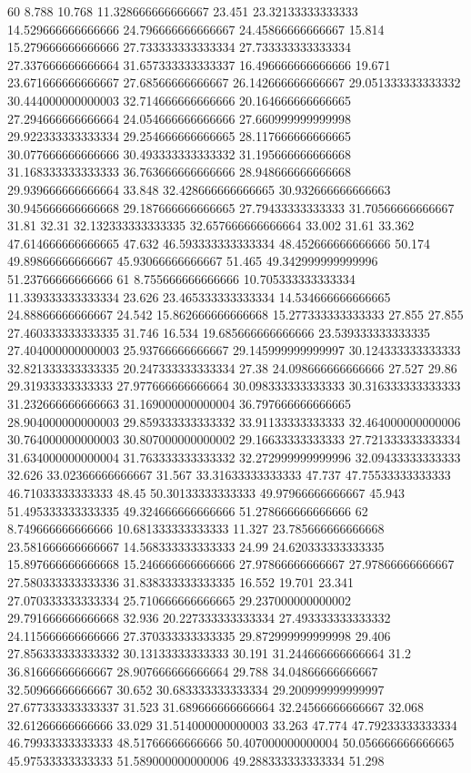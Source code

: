 60 8.788 10.768 11.328666666666667 23.451 23.32133333333333 14.529666666666666 24.796666666666667 24.45866666666667 15.814 15.279666666666666 27.733333333333334 27.733333333333334 27.337666666666664 31.657333333333337 16.496666666666666 19.671 23.671666666666667 27.68566666666667 26.142666666666667 29.051333333333332 30.444000000000003 32.714666666666666 20.164666666666665 27.294666666666664 24.054666666666666 27.660999999999998 29.922333333333334 29.254666666666665 28.117666666666665 30.077666666666666 30.493333333333332 31.195666666666668 31.168333333333333 36.763666666666666 28.948666666666668 29.939666666666664 33.848 32.428666666666665 30.932666666666663 30.945666666666668 29.187666666666665 27.79433333333333 31.70566666666667 31.81 32.31 32.132333333333335 32.657666666666664 33.002 31.61 33.362 47.614666666666665 47.632 46.593333333333334 48.452666666666666 50.174 49.89866666666667 45.93066666666667 51.465 49.342999999999996 51.23766666666666
61 8.755666666666666 10.705333333333334 11.339333333333334 23.626 23.465333333333334 14.534666666666665 24.88866666666667 24.542 15.862666666666668 15.277333333333333 27.855 27.855 27.460333333333335 31.746 16.534 19.685666666666666 23.539333333333335 27.404000000000003 25.93766666666667 29.145999999999997 30.124333333333333 32.821333333333335 20.247333333333334 27.38 24.098666666666666 27.527 29.86 29.31933333333333 27.977666666666664 30.098333333333333 30.316333333333333 31.232666666666663 31.169000000000004 36.797666666666665 28.904000000000003 29.859333333333332 33.91133333333333 32.464000000000006 30.764000000000003 30.807000000000002 29.16633333333333 27.721333333333334 31.634000000000004 31.763333333333332 32.272999999999996 32.09433333333333 32.626 33.02366666666667 31.567 33.31633333333333 47.737 47.75533333333333 46.71033333333333 48.45 50.30133333333333 49.97966666666667 45.943 51.495333333333335 49.324666666666666 51.278666666666666
62 8.749666666666666 10.681333333333333 11.327 23.785666666666668 23.581666666666667 14.568333333333333 24.99 24.620333333333335 15.897666666666668 15.246666666666666 27.97866666666667 27.97866666666667 27.580333333333336 31.838333333333335 16.552 19.701 23.341 27.070333333333334 25.710666666666665 29.237000000000002 29.791666666666668 32.936 20.227333333333334 27.493333333333332 24.115666666666666 27.370333333333335 29.872999999999998 29.406 27.856333333333332 30.13133333333333 30.191 31.244666666666664 31.2 36.81666666666667 28.907666666666664 29.788 34.04866666666667 32.50966666666667 30.652 30.683333333333334 29.200999999999997 27.677333333333337 31.523 31.689666666666664 32.24566666666667 32.068 32.61266666666666 33.029 31.514000000000003 33.263 47.774 47.79233333333334 46.79933333333333 48.51766666666666 50.407000000000004 50.056666666666665 45.97533333333333 51.589000000000006 49.288333333333334 51.298
